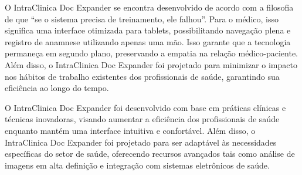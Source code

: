 O IntraClinica Doc Expander se encontra desenvolvido de acordo com a filosofia de que ``se o sistema precisa de treinamento, ele falhou''. Para o médico, isso significa uma interface otimizada para tablets, possibilitando navegação plena e registro de anamnese utilizando apenas uma mão. Isso garante que a tecnologia permaneça em segundo plano, preservando a empatia na relação médico-paciente. Além disso, o IntraClinica Doc Expander foi projetado para minimizar o impacto nos hábitos de trabalho existentes dos profissionais de saúde, garantindo sua eficiência ao longo do tempo.

O IntraClinica Doc Expander foi desenvolvido com base em práticas clínicas e técnicas inovadoras, visando aumentar a eficiência dos profissionais de saúde enquanto mantém uma interface intuitiva e confortável. Além disso, o IntraClinica Doc Expander foi projetado para ser adaptável às necessidades específicas do setor de saúde, oferecendo recursos avançados tais como análise de imagens em alta definição e integração com sistemas eletrônicos de saúde.
